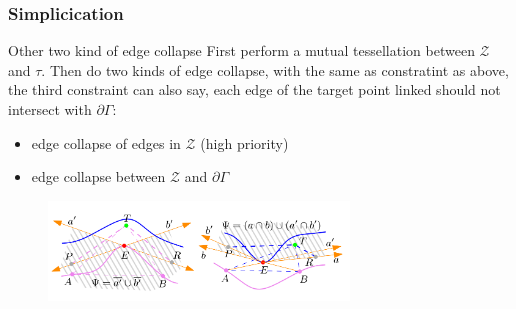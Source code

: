 \documentclass{beamer}
\begin{document}
\begin{frame}
\frametitle{Simplicication}
\begin{block}{Other two kind of edge collapse}
First perform a mutual tessellation between $\mathcal{Z}$ and $\tau$.
Then do two kinds of edge collapse, with the same as constratint as above, the third constraint can also say, each edge of the target point linked should not intersect with $\partial \Gamma$:
\begin{itemize}
  \item edge collapse of edges in $\mathcal{Z}$ (high priority)
  \item edge collapse between $\mathcal{Z}$ and $\partial \Gamma$
\end{itemize}
\end{block}
\begin{figure}[h]
  \includegraphics[width=8cm]{ec_z}
\end{figure}
\end{frame}

\end{document}
